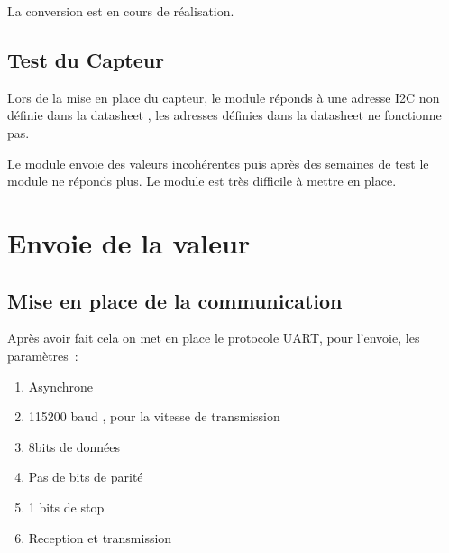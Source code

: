 \noindent La conversion est en cours de r\'{e}alisation.

\noindent 

\noindent 

\noindent 

\noindent 

\noindent 

\noindent 

\noindent 

\noindent 

\noindent 


\section{ Test du Capteur }

\noindent 

\noindent 

\noindent Lors de la mise en place du capteur, le module r\'{e}ponds \`{a} une adresse I2C non d\'{e}finie dans la datasheet , les adresses d\'{e}finies dans la datasheet ne fonctionne pas.

\noindent Le module envoie des valeurs incoh\'{e}rentes puis apr\`{e}s des semaines de test le module ne r\'{e}ponds plus. Le module est tr\`{e}s difficile \`{a} mettre en place.

\noindent 

\noindent \eject 


\chapter{ Envoie de la valeur}


\section{ Mise en place de la communication}

\noindent Apr\`{e}s avoir fait cela on met en place le protocole UART, pour l'envoie, les param\`{e}tres~:

\begin{enumerate}
\item  Asynchrone

\item  115200 baud , pour la vitesse de transmission

\item  8bits de donn\'{e}es 

\item  Pas de bits de parit\'{e}

\item  1 bits de stop

\item  Reception et transmission
\end{enumerate}

